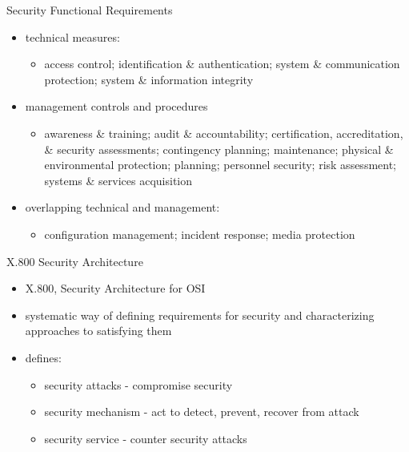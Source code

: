\documentclass{beamer}
\begin{document}
\begin{frame}{Security Functional Requirements}
  \begin{itemize}
  \item technical measures: 
    \begin{itemize}
      \item access control; identification \& authentication; system \& 
      communication protection; system \& information integrity 
    \end{itemize}
  \item management controls and procedures 
    \begin{itemize}
      \item awareness \& training; audit \& accountability; certification, 
      accreditation, \& security assessments; contingency planning; 
      maintenance; physical \& environmental protection; planning; 
      personnel security; risk assessment; systems \& services 
      acquisition 
    \end{itemize}
  \item overlapping technical and management: 
    \begin{itemize}
      \item configuration management; incident response; media protection
    \end{itemize}
  \end{itemize}
\end{frame}

\begin{frame}{X.800 Security Architecture}
  \begin{itemize}
    \item X.800, Security Architecture for OSI 
    \item systematic way of defining requirements for 
    security and characterizing approaches to 
    satisfying them 
    \item defines: 
      \begin{itemize}
        \item security attacks - compromise security 
        \item security mechanism - act to detect, prevent, 
        recover from attack 
        \item security service - counter security attacks 
      \end{itemize}
  \end{itemize}
\end{frame}
\end{document}
